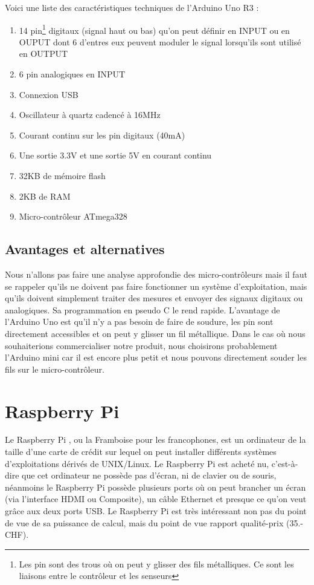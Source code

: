 \documentclass[a4paper,11pt]{report}
\begin{document}
{Voici une liste des caractéristiques techniques de l'Arduino Uno R3 \cite{Arduino}:
\begin{enumerate}
\item 14 pin\footnote{Les pin sont des trous où on peut y glisser des fils métalliques. Ce sont les liaisons entre le contrôleur et les senseurs} digitaux (signal haut ou bas) qu'on peut définir en INPUT ou en OUPUT dont 6 d'entres eux peuvent moduler le signal lorsqu'ils sont utilisé en OUTPUT
\item  6 pin analogiques en INPUT
\item Connexion USB
\item Oscillateur à quartz cadencé à 16MHz
\item Courant continu sur les pin digitaux (40mA)
\item Une sortie 3.3V et une sortie 5V en courant continu
\item 32KB de mémoire flash
\item 2KB de RAM
\item Micro-contrôleur ATmega328
\end{enumerate}
\subsection{Avantages et alternatives}
Nous n'allons pas faire une analyse approfondie des micro-contrôleurs mais il faut se rappeler qu'ils ne doivent pas faire fonctionner un système d'exploitation, mais qu'ils doivent simplement traiter des mesures et envoyer des signaux digitaux ou analogiques. Sa programmation en pseudo C le rend rapide. L'avantage de l'Arduino Uno est qu'il n'y a pas besoin de faire de soudure, les pin sont directement accessibles et on peut y glisser un fil métallique. Dans le cas où nous souhaiterions commercialiser notre produit, nous choisirons probablement l'Arduino mini car il est encore plus petit et nous pouvons directement souder les fils sur le micro-contrôleur.

\section{Raspberry Pi}
Le Raspberry Pi \cite{RaspberryPiCaracteristiques}, ou la Framboise pour les francophones, est un ordinateur de la taille d'une carte de crédit sur lequel on peut installer différents systèmes d'exploitations dérivés de UNIX/Linux. Le Raspberry Pi est acheté nu, c'est-à-dire que cet ordinateur ne possède pas d'écran, ni de clavier ou de souris, néanmoins le Raspberry Pi possède plusieurs ports où on peut brancher un écran (via l'interface HDMI ou Composite), un câble Ethernet et presque ce qu'on veut grâce aux deux ports USB. Le Raspberry Pi est très intéressant non pas du point de vue de sa puissance de calcul, mais du point de vue rapport qualité-prix (35.- CHF).

}
\end{document}
